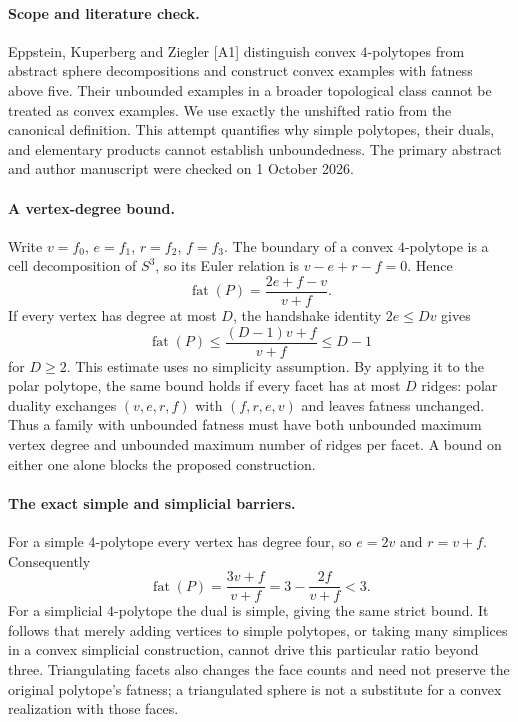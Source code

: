 \documentclass[11pt,a4paper]{article}
\begin{document}
\paragraph{Scope and literature check.}
Eppstein, Kuperberg and Ziegler [A1] distinguish convex $4$-polytopes from
abstract sphere decompositions and construct convex examples with fatness
above five. Their unbounded examples in a broader topological class cannot
be treated as convex examples. We use exactly the unshifted ratio from the
canonical definition. This attempt quantifies why simple polytopes, their
duals, and elementary products cannot establish unboundedness. The primary
abstract and author manuscript were checked on 1 October 2026.

\paragraph{A vertex-degree bound.}
Write $v=f_0$, $e=f_1$, $r=f_2$, $f=f_3$. The boundary of a convex
$4$-polytope is a cell decomposition of $S^3$, so its Euler relation is
$v-e+r-f=0$. Hence
\[
 \operatorname{fat}(P)=\frac{2e+f-v}{v+f}.
\]
If every vertex has degree at most $D$, the handshake identity $2e\le Dv$
gives
\[
 \operatorname{fat}(P)\le\frac{(D-1)v+f}{v+f}\le D-1
\]
for $D\ge2$. This estimate uses no simplicity assumption. By applying it
to the polar polytope, the same bound holds if every facet has at most $D$
ridges: polar duality exchanges $(v,e,r,f)$ with $(f,r,e,v)$ and leaves
fatness unchanged. Thus a family with unbounded fatness must have both
unbounded maximum vertex degree and unbounded maximum number of ridges per
facet. A bound on either one alone blocks the proposed construction.

\paragraph{The exact simple and simplicial barriers.}
For a simple $4$-polytope every vertex has degree four, so $e=2v$ and
$r=v+f$. Consequently
\[
 \operatorname{fat}(P)=\frac{3v+f}{v+f}=3-\frac{2f}{v+f}<3.
\]
For a simplicial $4$-polytope the dual is simple, giving the same strict bound.
It follows that merely adding vertices to simple polytopes, or taking many
simplices in a convex simplicial construction, cannot drive this particular
ratio beyond three. Triangulating facets also changes the face counts and
need not preserve the original polytope's fatness; a triangulated sphere is
not a substitute for a convex realization with those faces.
\end{document}
